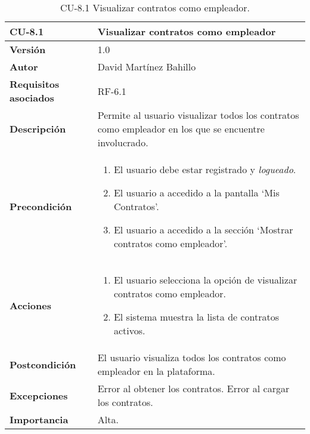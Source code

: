 \begin{table}[p]
	\centering
	\begin{tabularx}{\linewidth}{ p{} p{} }
		\toprule
		\textbf{CU-8.1}  & \textbf{Visualizar contratos como empleador}\\
		\midrule
		\textbf{Versión}              & 1.0    \\
		\textbf{Autor}                & David Martínez Bahillo \\
		\textbf{Requisitos asociados} & RF-6.1 \\
		\textbf{Descripción}          & Permite al usuario visualizar todos los contratos como empleador en los que se encuentre involucrado. \\
		\textbf{Precondición}         &  
		\begin{enumerate}
			\def\labelenumi{\arabic{enumi}.}
			\tightlist
			\item El usuario debe estar registrado y \textit{logueado}.
			\item El usuario a accedido a la pantalla `Mis Contratos'.
			\item El usuario a accedido a la sección `Mostrar contratos como empleador'.
		\end{enumerate}\\
		\textbf{Acciones}             &
		\begin{enumerate}
			\def\labelenumi{\arabic{enumi}.}
			\tightlist
			\item El usuario selecciona la opción de visualizar contratos como empleador.
			\item El sistema muestra la lista de contratos activos.
		\end{enumerate}\\
		\textbf{Postcondición}        & El usuario visualiza todos los contratos como empleador en la plataforma. \\
		\textbf{Excepciones}          & Error al obtener los contratos. Error al cargar los contratos. \\
		\textbf{Importancia}          & Alta. \\
		\bottomrule
	\end{tabularx}
	\caption{CU-8.1 Visualizar contratos como empleador.}
\end{table}


